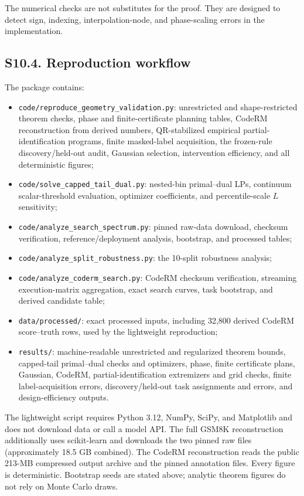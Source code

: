 \documentclass[10pt,twocolumn]{article}
\begin{document}
The numerical checks are not substitutes for the proof. They are designed to detect sign, indexing, interpolation-node, and phase-scaling errors in the implementation.

\subsection*{S10.4. Reproduction workflow}

The package contains:
\begin{itemize}
\item \texttt{code/reproduce\_geometry\_validation.py}: unrestricted and shape-restricted theorem checks, phase and finite-certificate planning tables, CodeRM reconstruction from derived numbers, QR-stabilized empirical partial-identification programs, finite masked-label acquisition, the frozen-rule discovery/held-out audit, Gaussian selection, intervention efficiency, and all deterministic figures;
\item \texttt{code/solve\_capped\_tail\_dual.py}: nested-bin primal--dual LPs, continuum scalar-threshold evaluation, optimizer coefficients, and percentile-scale $L$ sensitivity;
\item \texttt{code/analyze\_search\_spectrum.py}: pinned raw-data download, checksum verification, reference/deployment analysis, bootstrap, and processed tables;
\item \texttt{code/analyze\_split\_robustness.py}: the 10-split robustness analysis;
\item \texttt{code/analyze\_coderm\_search.py}: CodeRM checksum verification, streaming execution-matrix aggregation, exact search curves, task bootstrap, and derived candidate table;
\item \texttt{data/processed/}: exact processed inputs, including 32,800 derived CodeRM score--truth rows, used by the lightweight reproduction;
\item \texttt{results/}: machine-readable unrestricted and regularized theorem bounds, capped-tail primal--dual checks and optimizers, phase, finite certificate plans, Gaussian, CodeRM, partial-identification extremizers and grid checks, finite label-acquisition errors, discovery/held-out task assignments and errors, and design-efficiency outputs.
\end{itemize}
The lightweight script requires Python 3.12, NumPy, SciPy, and Matplotlib and does not download data or call a model API. The full GSM8K reconstruction additionally uses scikit-learn and downloads the two pinned raw files (approximately 18.5 GB combined). The CodeRM reconstruction reads the public 213-MB compressed output archive and the pinned annotation files. Every figure is deterministic. Bootstrap seeds are stated above; analytic theorem figures do not rely on Monte Carlo draws.
\end{document}
